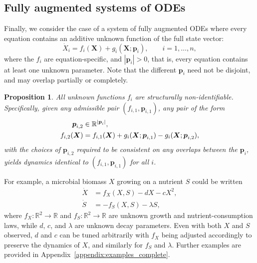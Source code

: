 \documentclass{article}
\theoremstyle{plain}
\newtheorem{proposition}{Proposition}[section]
\theoremstyle{definition}
\renewcommand{\vec}[1]{\boldsymbol{#1}}
\begin{document}
{%

\subsection{Fully augmented systems of ODEs} \label{sec:nonident_complete_UDEs}

Finally, we consider the case of a system of fully augmented ODEs where every equation contains an additive unknown function of the full state vector:
\begin{equation}
    \label{eq:complete_UDE}
    \dot{X}_i = f_i(\vec{X}) + g_i(\vec{X};\vec{p}_i), \qquad i = 1,\ldots,n,
\end{equation}
where the $f_i$ are equation-specific, and $|\vec{p}_i|>0$, that is, every equation contains at least one unknown parameter. Note that the different $\vec{p}_i$ need not be disjoint, and may overlap partially or completely.

\begin{proposition} \label{prop:complete_UDE_nonident}
All unknown functions $f_i$ are structurally non-identifiable. Specifically, given any admissible pair $(f_{i,1}, \vec{p}_{i,1})$, any pair of the form
\begin{align}
    \vec{p}_{i,2} &\in \mathbb{R}^{|\vec{p}_i|}, \notag \\
    \label{eq:complete_UDE_nonident_expr}
    f_{i,2}(\vec{X}) &= f_{i,1}(\vec{X}) + g_i(\vec{X};\vec{p}_{i,1}) - g_i(\vec{X};\vec{p}_{i,2}),
\end{align}
with the choices of $\vec{p}_{i,2}$ required to be consistent on any overlaps between the $\vec{p}_i$, yields dynamics identical to $(f_{i,1}, \vec{p}_{i,1})$ for all $i$.
\end{proposition}

For example, a microbial biomass $X$ growing on a nutrient $S$ could be written
\begin{align*}
    \dot{X} &= f_X(X,S) - dX - cX^2, \\
    \dot{S} &= -f_S(X,S) - \lambda S,
\end{align*}
where $f_X:\mathbb{R}^2\to\mathbb{R}$ and $f_S:\mathbb{R}^2\to\mathbb{R}$ are unknown growth and nutrient-consumption laws, while $d$, $c$, and $\lambda$ are unknown decay parameters. Even with both $X$ and $S$ observed, $d$ and $c$ can be tuned arbitrarily with $f_X$ being adjusted accordingly to preserve the dynamics of $X$, and similarly for $f_S$ and $\lambda$. Further examples are provided in Appendix~\ref{appendix:examples_complete}. 

}
\end{document}
